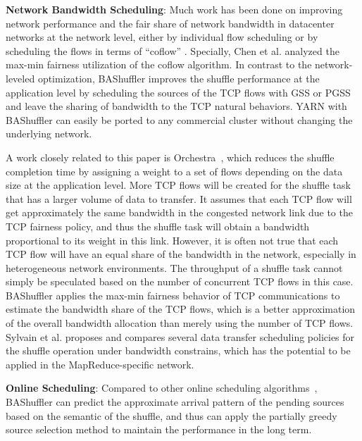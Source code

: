 \documentclass[10pt,journal,compsoc]{IEEEtran}
\begin{document}
\textbf{Network Bandwidth Scheduling}:
Much work has been done on
improving network performance and the fair share of network bandwidth
in datacenter networks at the network level, 
either by individual flow scheduling \cite{greenberg2009vl2, popa2012faircloud, shieh2011sharing,ballani2011towards} 
or by scheduling the flows in terms of ``coflow'' \cite{dogar2014decentralized, chowdhury2014efficient, Qiu:2015:MTW, chowdhury2015efficient, zhao2015rapier, chen2016coflow}. 
Specially, Chen et al. \cite{chen2016coflow} analyzed the max-min fairness utilization of the coflow algorithm. 
In contrast to the network-leveled optimization, BAShuffler improves the shuffle performance at the application
level by scheduling the sources
of the TCP flows with GSS or PGSS and leave the sharing of bandwidth
to the TCP natural behaviors.
YARN with BAShuffler can easily be ported to any commercial cluster
without changing the underlying network.


A work closely related to this paper is Orchestra~\cite{chowdhury2011managing}, which reduces the shuffle completion
time by assigning a weight to a set of flows
depending on the data size at the application level. 
More TCP flows will be created for the shuffle task that has a larger
volume of data to transfer.
It assumes that each TCP flow will get approximately the same bandwidth 
in the congested network link due to the TCP fairness policy, 
and thus the shuffle task will obtain a bandwidth proportional to
its weight in this link.
However, it is often not true that each TCP flow will have an equal share
of the bandwidth in the network,
especially in heterogeneous network environments. 
The throughput of a shuffle task cannot simply be speculated based on the
number of concurrent TCP flows in this case.
BAShuffler applies the max-min fairness behavior of TCP communications
to estimate the bandwidth share of the TCP flows,
which is a better approximation of the overall bandwidth allocation
than merely using the number of TCP flows.
Sylvain et al. \cite{gault2014dynamic} proposes and compares several data transfer scheduling policies for the shuffle operation under bandwidth constrains, 
which has the potential to be applied in the MapReduce-specific network. 


\textbf{Online Scheduling}:
Compared to other online scheduling algorithms~\cite{wu2007scheduling,awerbuch1992competitive,borodin2005online,sgall1998line},
BAShuffler can predict the approximate arrival pattern of the pending
sources based on the semantic of the shuffle,
and thus can apply the partially greedy source selection method to
maintain the performance in the long term.
\end{document}
